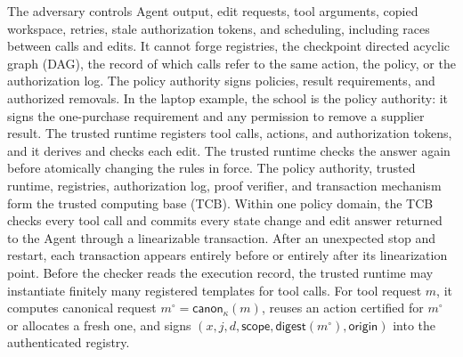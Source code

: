 The adversary controls Agent output, edit requests, tool arguments, copied workspace, retries, stale authorization tokens, and scheduling, including races between calls and edits.
It cannot forge registries, the checkpoint directed acyclic graph (DAG), the record of which calls refer to the same action, the policy, or the authorization log.
The policy authority signs policies, result requirements, and authorized removals.
In the laptop example, the school is the policy authority: it signs the one-purchase requirement and any permission to remove a supplier result.
The trusted runtime registers tool calls, actions, and authorization tokens, and it derives and checks each edit.
The trusted runtime checks the answer again before atomically changing the rules in force.
The policy authority, trusted runtime, registries, authorization log, proof verifier, and transaction mechanism form the trusted computing base (TCB).
Within one policy domain, the TCB checks every tool call and commits every state change and edit answer returned to the Agent through a linearizable transaction.
After an unexpected stop and restart, each transaction appears entirely before or entirely after its linearization point.
Before the checker reads the execution record, the trusted runtime may instantiate finitely many registered templates for tool calls.
For tool request \(m\), it computes canonical request \(m^\circ=\mathsf{canon}_\kappa(m)\), reuses an action certified for \(m^\circ\) or allocates a fresh one, and signs \((x,j,d,\mathsf{scope},\mathsf{digest}(m^\circ),\mathsf{origin})\) into the authenticated registry.
